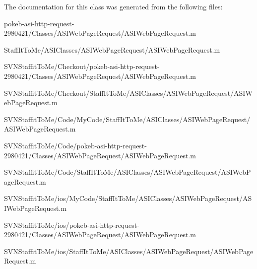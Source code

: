 \-The documentation for this class was generated from the following files\-:\begin{DoxyCompactItemize}
\item 
pokeb-\/asi-\/http-\/request-\/2980421/\-Classes/\-A\-S\-I\-Web\-Page\-Request/\-A\-S\-I\-Web\-Page\-Request.\-m\item 
\-Staff\-It\-To\-Me/\-A\-S\-I\-Classes/\-A\-S\-I\-Web\-Page\-Request/\-A\-S\-I\-Web\-Page\-Request.\-m\item 
\-S\-V\-N\-Staffit\-To\-Me/\-Checkout/pokeb-\/asi-\/http-\/request-\/2980421/\-Classes/\-A\-S\-I\-Web\-Page\-Request/\-A\-S\-I\-Web\-Page\-Request.\-m\item 
\-S\-V\-N\-Staffit\-To\-Me/\-Checkout/\-Staff\-It\-To\-Me/\-A\-S\-I\-Classes/\-A\-S\-I\-Web\-Page\-Request/\-A\-S\-I\-Web\-Page\-Request.\-m\item 
\-S\-V\-N\-Staffit\-To\-Me/\-Code/\-My\-Code/\-Staff\-It\-To\-Me/\-A\-S\-I\-Classes/\-A\-S\-I\-Web\-Page\-Request/\-A\-S\-I\-Web\-Page\-Request.\-m\item 
\-S\-V\-N\-Staffit\-To\-Me/\-Code/pokeb-\/asi-\/http-\/request-\/2980421/\-Classes/\-A\-S\-I\-Web\-Page\-Request/\-A\-S\-I\-Web\-Page\-Request.\-m\item 
\-S\-V\-N\-Staffit\-To\-Me/\-Code/\-Staff\-It\-To\-Me/\-A\-S\-I\-Classes/\-A\-S\-I\-Web\-Page\-Request/\-A\-S\-I\-Web\-Page\-Request.\-m\item 
\-S\-V\-N\-Staffit\-To\-Me/ios/\-My\-Code/\-Staff\-It\-To\-Me/\-A\-S\-I\-Classes/\-A\-S\-I\-Web\-Page\-Request/\-A\-S\-I\-Web\-Page\-Request.\-m\item 
\-S\-V\-N\-Staffit\-To\-Me/ios/pokeb-\/asi-\/http-\/request-\/2980421/\-Classes/\-A\-S\-I\-Web\-Page\-Request/\-A\-S\-I\-Web\-Page\-Request.\-m\item 
\-S\-V\-N\-Staffit\-To\-Me/ios/\-Staff\-It\-To\-Me/\-A\-S\-I\-Classes/\-A\-S\-I\-Web\-Page\-Request/\-A\-S\-I\-Web\-Page\-Request.\-m\end{DoxyCompactItemize}
